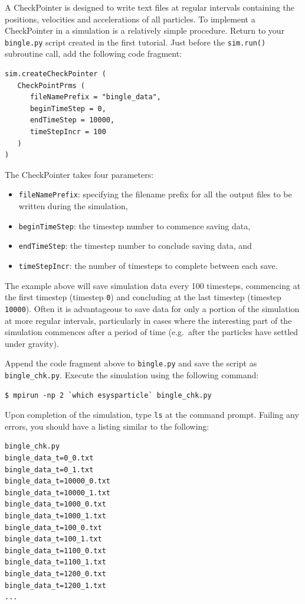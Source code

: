 A CheckPointer is designed to write text files at regular intervals containing the positions, velocities and accelerations of all particles. To implement a CheckPointer in a simulation is a relatively simple procedure. Return to your \texttt{bingle.py} script created in the first tutorial. Just before the \texttt{sim.run()} subroutine call, add the following code fragment:

\begin{verbatim}
sim.createCheckPointer (
   CheckPointPrms (
      fileNamePrefix = "bingle_data",
      beginTimeStep = 0,
      endTimeStep = 10000,
      timeStepIncr = 100
   )
)
\end{verbatim}

\noindent
The CheckPointer takes four parameters: 
\begin{itemize}
\item \texttt{fileNamePrefix}: specifying the filename prefix for all the output files to be written during the simulation,
\item \texttt{beginTimeStep}: the timestep number to commence saving data,
\item \texttt{endTimeStep}: the timestep number to conclude saving data, and
\item \texttt{timeStepIncr}: the number of timesteps to complete between each save.
\end{itemize}

\noindent
The example above will save simulation data every 100 timesteps, commencing at the first timestep (timestep \texttt{0}) and concluding at the last timestep (timestep \texttt{10000}). Often it is advantageous to save data for only a portion of the simulation at more regular intervals, particularly in cases where the interesting part of the simulation commences after a period of time (e.g.\ after the particles have settled under gravity). 

Append the code fragment above to \texttt{bingle.py} and save the script as \texttt{bingle\_chk.py}. Execute the simulation using the following command:

\begin{verbatim}
$ mpirun -np 2 `which esysparticle` bingle_chk.py
\end{verbatim}

Upon completion of the simulation, type \texttt{ls} at the command prompt. Failing any errors, you should have a listing similar to the following:

\begin{verbatim}
bingle_chk.py
bingle_data_t=0_0.txt
bingle_data_t=0_1.txt
bingle_data_t=10000_0.txt
bingle_data_t=10000_1.txt
bingle_data_t=1000_0.txt
bingle_data_t=1000_1.txt
bingle_data_t=100_0.txt
bingle_data_t=100_1.txt
bingle_data_t=1100_0.txt
bingle_data_t=1100_1.txt
bingle_data_t=1200_0.txt
bingle_data_t=1200_1.txt
...
\end{verbatim}

